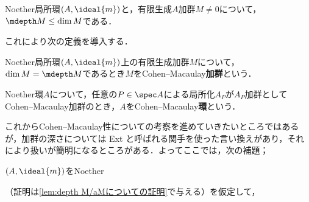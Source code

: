 \begin{cor}
	Noether局所環$(A,\ideal{m})$と，有限生成$A$加群$M\neq0$について，$\mdepth M\leq\dim M$である．
\end{cor}

これにより次の定義を導入する．

\begin{defi}
	Noether局所環$(A,\ideal{m})$上の有限生成加群$M$について，$\dim M=\mdepth M$であるとき$M$をCohen--Macaulay\textbf{加群}という．
\end{defi}

\begin{defi}
	Noether環$A$について，任意の$P\in\spec A$による局所化$A_P$が$A_P$加群としてCohen--Macaulay加群のとき，$A$をCohen--Macaulay\textbf{環}という．
\end{defi}

これからCohen--Macaulay性についての考察を進めていきたいところではあるが，加群の深さについては Ext と呼ばれる関手を使った言い換えがあり，それにより扱いが簡明になるところがある．よってここでは，次の補題；

\begin{lem}\label{lem:depth M/aM=depth M-1}
	$(A,\ideal{m})$をNoether
\end{lem}
（証明は\ref{lem:depth M/aMについての証明}で与える）を仮定して，
